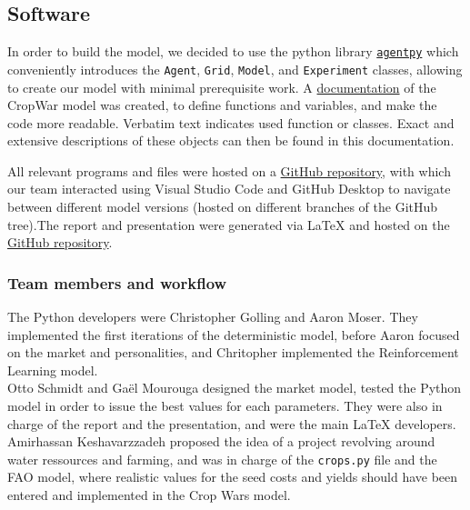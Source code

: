 \documentclass[a4paper,12pt]{article} %
\begin{document}
\subsection{Software}
In order to build the model, we decided to use the python library \href{https://agentpy.readthedocs.io/en/stable/overview.html}{\texttt{agentpy}} which conveniently introduces the \texttt{Agent}, \texttt{Grid}, \texttt{Model}, and \texttt{Experiment} classes, allowing to create our model with minimal prerequisite work. A \href{https://n.ethz.ch/~cgolling/gess/html/index.html}{documentation} of the CropWar model was created, to define functions and variables, and make the code more readable. Verbatim text indicates used function or classes. Exact and extensive descriptions of these objects can then be found in this documentation.

All relevant programs and files were hosted on a \href{https://github.com/Anon75014/AgentBasedModelling}{GitHub repository}, with which our team interacted using Visual Studio Code and GitHub Desktop to navigate between different model versions (hosted on different branches of the GitHub tree).The report and presentation were generated via LaTeX and hosted on the \href{https://github.com/Anon75014/AgentBasedModelling}{GitHub repository}.

\subsubsection{Team members and workflow}

The Python developers were Christopher Golling and Aaron Moser. They implemented the first iterations of the deterministic model, before Aaron focused on the market and personalities, and Chritopher implemented the Reinforcement Learning model.\\
Otto Schmidt and Ga\"el Mourouga designed the market model, tested the Python model in order to issue the best values for each parameters. They were also in charge of the report and the presentation, and were the main LaTeX developers.\\
Amirhassan Keshavarzzadeh proposed the idea of a project revolving around water ressources and farming, and was in charge of the \texttt{crops.py} file and the FAO model, where realistic values for the seed costs and yields should have been entered and implemented in the Crop Wars model.



\end{document}

